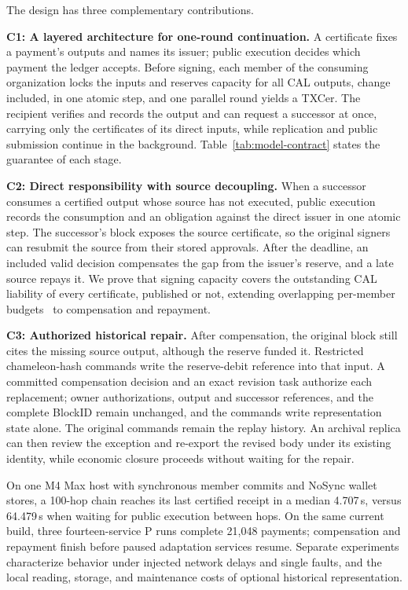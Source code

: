 The design has three complementary contributions.

\noindent\textbf{C1: A layered architecture for one-round continuation.} A certificate
fixes a payment's outputs and names its issuer; public execution decides
which payment the ledger accepts. Before signing, each member of the
consuming organization locks the inputs and reserves capacity for all CAL
outputs, change included, in one atomic step, and one parallel round yields
a TXCer. The recipient verifies and records the output and can request a
successor at once, carrying only the certificates of its direct inputs,
while replication and public submission continue in the background.
Table~\ref{tab:model-contract} states the guarantee of each stage.

\noindent\textbf{C2: Direct responsibility with source decoupling.} When a successor
consumes a certified output whose source has not executed, public execution
records the consumption and an obligation against the direct issuer in one
atomic step. The successor's block exposes the source certificate, so the
original signers can resubmit the source from their stored approvals. After
the deadline, an included valid decision compensates the gap from the issuer's
reserve, and a late source repays it. We prove that signing capacity covers
the outstanding CAL liability of every certificate, published or not,
extending overlapping per-member budgets~\cite{stingray} to compensation
and repayment.

\noindent\textbf{C3: Authorized historical repair.} After compensation, the original
block still cites the missing source output, although the reserve funded
it. Restricted chameleon-hash commands write the reserve-debit reference
into that input. A committed compensation decision and an exact revision
task authorize each replacement; owner authorizations, output and successor
references, and the complete BlockID remain unchanged, and the commands
write representation state alone. The original commands remain the replay
history. An archival replica can then review the exception and re-export
the revised body under its existing identity, while economic closure
proceeds without waiting for the repair.

On one M4 Max host with synchronous member commits and NoSync wallet
stores, a 100-hop chain reaches its last certified receipt in a median
4.707\,s, versus 64.479\,s when waiting for public execution between
hops. On the same current build, three fourteen-service P runs complete
21,048 payments; compensation and repayment finish before paused
adaptation services resume. Separate experiments characterize behavior
under injected network delays and single faults, and the local reading,
storage, and maintenance costs of optional historical representation.
